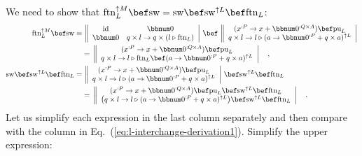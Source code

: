 We need to show that $\text{ftn}_{L}^{\uparrow M}\bef\text{sw}=\text{sw}\bef\text{sw}^{\uparrow L}\bef\text{ftn}_{L}$:
\begin{align}
\text{ftn}_{L}^{\uparrow M}\bef\text{sw}= & \,\left\Vert \begin{array}{cc}
\text{id} & \bbnum 0\\
\bbnum 0 & q\times l\rightarrow q\times(l\triangleright\text{ftn}_{L})
\end{array}\right|\,\bef\,\left\Vert \begin{array}{c}
(x^{:P}\rightarrow x+\bbnum 0^{:Q\times A})\bef\text{pu}_{L}\\
q\times l\rightarrow l\triangleright(a\rightarrow\bbnum 0^{:P}+q\times a)^{\uparrow L}
\end{array}\right|\nonumber \\
 & =\,\left\Vert \begin{array}{c}
(x^{:P}\rightarrow x+\bbnum 0^{:Q\times A})\bef\text{pu}_{L}\\
q\times l\rightarrow l\triangleright\text{ftn}_{L}\bef(a\rightarrow\bbnum 0^{:P}+q\times a)^{\uparrow L}
\end{array}\right|\quad,\label{eq:l-interchange-derivation1}\\
\text{sw}\bef\text{sw}^{\uparrow L}\bef\text{ftn}_{L}= & \,\left\Vert \begin{array}{c}
(x^{:P}\rightarrow x+\bbnum 0^{:Q\times A})\bef\text{pu}_{L}\\
q\times l\rightarrow l\triangleright(a\rightarrow\bbnum 0^{:P}+q\times a)^{\uparrow L}
\end{array}\right|\,\bef\text{sw}^{\uparrow L}\bef\text{ftn}_{L}\nonumber \\
 & =\,\left\Vert \begin{array}{c}
(x^{:P}\rightarrow x+\bbnum 0^{:Q\times A})\bef\text{pu}_{L}\bef\text{sw}^{\uparrow L}\bef\text{ftn}_{L}\\
\big(q\times l\rightarrow l\triangleright(a\rightarrow\bbnum 0^{:P}+q\times a)^{\uparrow L}\big)\bef\text{sw}^{\uparrow L}\bef\text{ftn}_{L}
\end{array}\right|\quad.\nonumber 
\end{align}
Let us simplify each expression in the last column separately and
then compare with the column in Eq.~(\ref{eq:l-interchange-derivation1}).
Simplify the upper expression:
